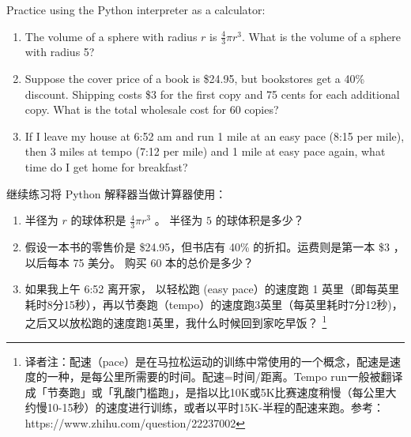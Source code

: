 \begin{exercise}

Practice using the Python interpreter as a calculator:

\begin{enumerate}

\item The volume of a sphere with radius $r$ is $\frac{4}{3} \pi r^3$.
  What is the volume of a sphere with radius 5?

\item Suppose the cover price of a book is \$24.95, but bookstores get a
  40\% discount.  Shipping costs \$3 for the first copy and 75 cents
  for each additional copy.  What is the total wholesale cost for
  60 copies?

\item If I leave my house at 6:52 am and run 1 mile at an easy pace
  (8:15 per mile), then 3 miles at tempo (7:12 per mile) and 1 mile at
  easy pace again, what time do I get home for breakfast?

\end{enumerate}

继续练习将 Python 解释器当做计算器使用：

\begin{enumerate}

\item 半径为 $r$ 的球体积是 $\frac{4}{3} \pi r^3$ 。 半径为 $5$ 的球体积是多少？

\item 假设一本书的零售价是 \$24.95，但书店有 40\% 的折扣。运费则是第一本 \$3 ，以后每本 75 美分。 购买 60 本的总价是多少？

\item 如果我上午 6:52 离开家， 以轻松跑 (easy pace）的速度跑 1 英里（即每英里耗时8分15秒），再以节奏跑（tempo）的速度跑3英里（每英里耗时7分12秒)，之后又以放松跑的速度跑1英里，我什么时候回到家吃早饭？ \footnote{译者注：配速（pace）是在马拉松运动的训练中常使用的一个概念，配速是速度的一种，是每公里所需要的时间。配速=时间/距离。Tempo run一般被翻译成「节奏跑」或「乳酸门槛跑」，是指以比10K或5K比赛速度稍慢（每公里大约慢10-15秒）的速度进行训练，或者以平时15K-半程的配速来跑。参考：https://www.zhihu.com/question/22237002}

\end{enumerate}

\end{exercise}

